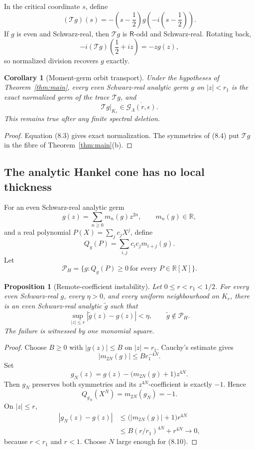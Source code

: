 \documentclass[11pt]{article}
\newtheorem{proposition}[theorem]{Proposition}
\newtheorem{corollary}[theorem]{Corollary}
\newcommand{\R}{\mathbb R}
\newcommand{\cG}{\mathcal G}
\newcommand{\cP}{\mathcal P}
\newcommand{\cT}{\mathcal T}
\newcommand{\FE}{\mathsf R}
\begin{document}
In the critical coordinate \(s\), define
\[
 (\cT g)(s)
 =-\left(s-\frac12\right)
    g\!\left(-i\left(s-\frac12\right)\right).
\tag{8.4}
\]
If \(g\) is even and Schwarz-real, then \(\cT g\) is \(\FE\)-odd and
Schwarz-real.  Rotating back,
\[
 -i(\cT g)\!\left(\frac12+iz\right)=-zg(z),
\tag{8.5}
\]
so normalized division recovers \(g\) exactly.

\begin{corollary}[Moment-germ orbit transport]\label{cor:momentorbit}
Under the hypotheses of Theorem~\ref{thm:main}, every even Schwarz-real analytic
germ \(g\) on \(|z|<r_1\) is the exact normalized germ of the trace \(\cT g\), and
\[
 \cT g|_{K_r}\in\overline{\cG_\Lambda(r,\epsilon)}.
\tag{8.6}
\]
This remains true after any finite spectral deletion.
\end{corollary}

\begin{proof}
Equation (8.3) gives exact normalization.  The symmetries of (8.4) put
\(\cT g\) in the fibre of Theorem~\ref{thm:main}(b).
\end{proof}

\subsection{The analytic Hankel cone has no local thickness}

For an even Schwarz-real analytic germ
\[
 g(z)=\sum_{n\geq0}m_n(g)z^{2n},
\qquad m_n(g)\in\R,
\tag{8.7}
\]
and a real polynomial \(P(X)=\sum_jc_jX^j\), define
\[
 Q_g(P)=\sum_{i,j}c_ic_jm_{i+j}(g).
\tag{8.8}
\]
Let
\[
 \cP_H=\{g:Q_g(P)\geq0\ \text{for every }P\in\R[X]\}.
\tag{8.9}
\]

\begin{proposition}[Remote-coefficient instability]\label{prop:instability}
Let \(0\leq r<r_1<1/2\).  For every even Schwarz-real \(g\), every
\(\eta>0\), and every uniform neighbourhood on \(K_r\), there is an even
Schwarz-real analytic \(\widetilde g\) such that
\[
 \sup_{|z|\leq r}|\widetilde g(z)-g(z)|<\eta,
 \qquad
 \widetilde g\notin\cP_H.
\tag{8.10}
\]
The failure is witnessed by one monomial square.
\end{proposition}

\begin{proof}
Choose \(B\geq0\) with \(|g(z)|\leq B\) on \(|z|=r_1\).  Cauchy's estimate gives
\[
 |m_{2N}(g)|\leq Br_1^{-4N}.
\tag{8.11}
\]
Set
\[
 g_N(z)=g(z)-\bigl(m_{2N}(g)+1\bigr)z^{4N}.
\tag{8.12}
\]
Then \(g_N\) preserves both symmetries and its \(z^{4N}\)-coefficient is exactly
\(-1\).  Hence
\[
 Q_{g_N}(X^N)=m_{2N}(g_N)=-1.
\tag{8.13}
\]
On \(|z|\leq r\),
\[
\begin{aligned}
 |g_N(z)-g(z)|
 &\leq\bigl(|m_{2N}(g)|+1\bigr)r^{4N}\\
 &\leq B(r/r_1)^{4N}+r^{4N}\longrightarrow0,
\end{aligned}
\tag{8.14}
\]
because \(r<r_1\) and \(r<1\).  Choose \(N\) large enough for (8.10).
\end{proof}
\end{document}

